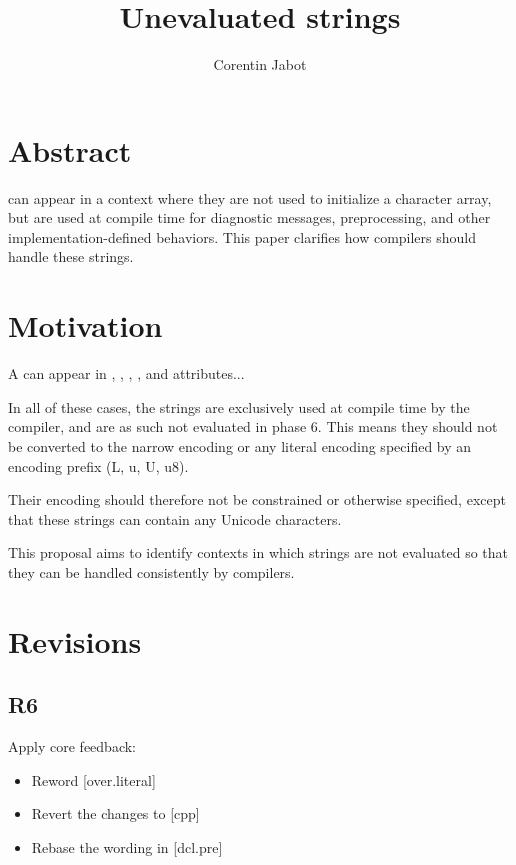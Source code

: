 \documentclass{wg21}
\title{Unevaluated strings}
\author{Corentin Jabot}{corentin.jabot@gmail.com}
\begin{document}
\maketitle

\section{Abstract}

 can appear in a context where they are not used to
initialize a character array, but are used at compile time for diagnostic messages,
preprocessing, and other implementation-defined behaviors.
This paper clarifies how compilers should handle these strings.


\section{Motivation}

A  can appear in , , ,
, \tcode{[[deprecated]]} and \tcode{[[nodiscard]]} attributes...

In all of these cases, the strings are exclusively used at compile time by the compiler, and are as such not evaluated in phase 6.
This means they should not be converted to the narrow encoding or any literal encoding specified by an encoding prefix (L, u, U, u8).

Their encoding should therefore not be constrained or otherwise specified,
except that these strings can contain any Unicode characters.

This proposal aims to identify contexts in which strings are not evaluated so that they can be handled consistently by compilers.

\section{Revisions}

\subsection{R6}
Apply core feedback:
\begin{itemize}
\item Reword [over.literal]
\item Revert the changes to [cpp]
\item Rebase the wording in [dcl.pre]
\end{itemize}
\end{document}
